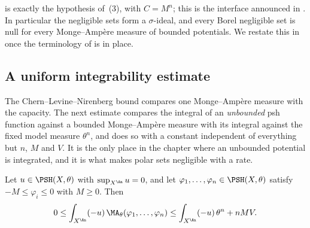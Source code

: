  is exactly the hypothesis of
\,(3), with \(C=M^n\); this is the interface
announced in .  In particular the negligible
sets form a \(\sigma\)-ideal, and every Borel negligible set is null for
every Monge--Amp\`ere measure of bounded potentials.  We restate this in
 once the terminology of
 is in place.

\subsection{A uniform integrability estimate}
\label{sec:ch25-uniform-integrability}

The Chern--Levine--Nirenberg bound compares one Monge--Amp\`ere measure with
the capacity.  The next estimate compares the integral of an
\emph{unbounded} psh function against a bounded Monge--Amp\`ere measure with
its integral against the fixed model measure \(\theta^n\), and does so with a
constant independent of everything but \(n\), \(M\) and \(V\).  It is the
only place in the chapter where an unbounded potential is integrated, and it
is what makes polar sets negligible with a rate.

\begin{lemma}
\label{lem:ch25-uniform-integrability}
Let \(u\in\PSH(X,\theta)\) with \(\sup_{X^{\An}}u=0\), and let
\(\varphi_1,\ldots,\varphi_n\in\PSH(X,\theta)\) satisfy
\(-M\leq\varphi_i\leq0\) with \(M\geq0\).  Then
\begin{equation}
\label{eq:ch25-uniform-integrability}
 0\leq\int_{X^{\An}}(-u)\,\MA_\theta(\varphi_1,\ldots,\varphi_n)
 \leq\int_{X^{\An}}(-u)\,\theta^n+nMV .
\end{equation}
\end{lemma}

